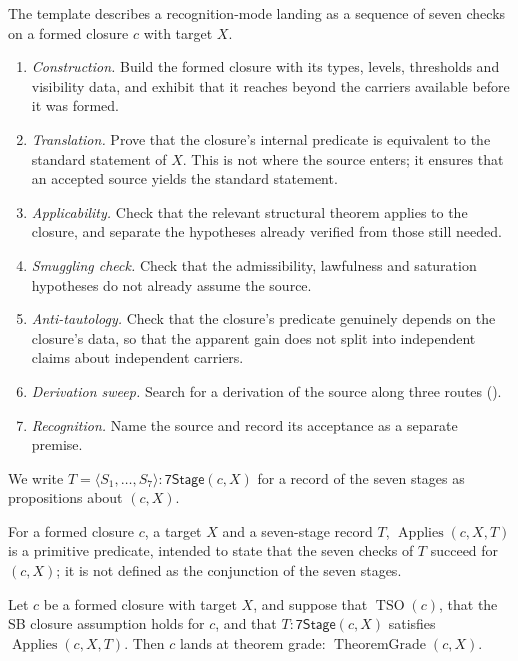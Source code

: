 The template describes a recognition-mode landing as a sequence of
seven checks on a formed closure \(c\) with target \(X\).
\begin{enumerate}
\item \emph{Construction.}  Build the formed closure with its types,
  levels, thresholds and visibility data, and exhibit that it reaches
  beyond the carriers available before it was formed.
\item \emph{Translation.}  Prove that the closure's internal predicate
  is equivalent to the standard statement of \(X\).  This is not where
  the source enters; it ensures that an accepted source yields the
  standard statement.
\item \emph{Applicability.}  Check that the relevant structural theorem
  applies to the closure, and separate the hypotheses already verified
  from those still needed.
\item \emph{Smuggling check.}  Check that the admissibility,
  lawfulness and saturation hypotheses do not already assume the source.
\item \emph{Anti-tautology.}  Check that the closure's predicate
  genuinely depends on the closure's data, so that the apparent gain
  does not split into independent claims about independent carriers.
\item \emph{Derivation sweep.}  Search for a derivation of the source
  along three routes ().
\item \emph{Recognition.}  Name the source and record its acceptance as
  a separate premise.
\end{enumerate}
We write \(T=\langle S_{1},\ldots,S_{7}\rangle:\mathsf{7Stage}(c,X)\) for a
record of the seven stages as propositions about \((c,X)\).

\begin{definition}\label{def:applies}
For a formed closure \(c\), a target \(X\) and a seven-stage record
\(T\), \(\operatorname{Applies}(c,X,T)\) is a primitive predicate,
intended to state that the seven checks of \(T\) succeed for \((c,X)\);
it is not defined as the conjunction of the seven stages.
\end{definition}

\begin{schema}\label{thm:template-applicability}
Let \(c\) be a formed closure with target \(X\), and suppose that
\(\operatorname{TSO}(c)\), that the SB closure assumption holds for \(c\),
and that \(T:\mathsf{7Stage}(c,X)\) satisfies
\(\operatorname{Applies}(c,X,T)\).  Then \(c\) lands at theorem grade:
\(\operatorname{TheoremGrade}(c,X)\).
\end{schema}

